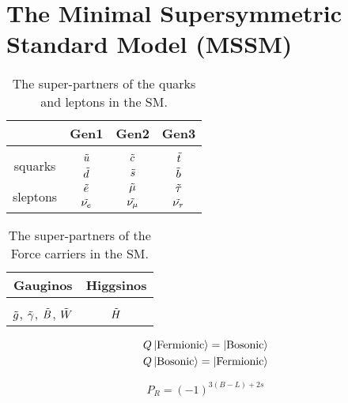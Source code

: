 \section{The Minimal Supersymmetric Standard Model (MSSM)}


\begin{table}[htbp]
    \centering
    \begin{tabular}{||c|c|c|c||}
    \hline
    & Gen1 & Gen2 & Gen3 \\
    \hline
    & \\[-2.7ex]
    \multirow{2}{1.4cm}{squarks} & $\Tilde{u}$ & $\Tilde{c}$ & \small$\Tilde{t}$ \\
     & $\Tilde{d}$ & $\Tilde{s}$ & $\Tilde{b}$ \\
    \hline
    
    \multirow{2}{1.4cm}{sleptons} & $\Tilde{e}$ & $\Tilde{\mu}$ & $\Tilde{\tau}$ \\
     & $\Tilde{\nu_e}$ & $\Tilde{\nu_\mu}$ & $\Tilde{\nu_\tau}$ \\
    \hline
    \end{tabular}
    \caption{The super-partners of the quarks and leptons in the SM.}
    \label{tab:SUSYspart}
\end{table}

\begin{table}[htbp]
    \centering
    \begin{tabular}{||c|c||}
    \hline 
       Gauginos  & Higgsinos \\
       \hline
        & \\[-2.5ex]
      $\Tilde{g}$, $\Tilde{\gamma}$, $\Tilde{B}$, $\Tilde{W}$ & $\Tilde{H}$ \\
     \hline
    \end{tabular}
    \caption{The super-partners of the Force carriers in the SM.}
    \label{tab:SUSYinos}
\end{table}


\begin{align}
     Q\ket{\text{Fermionic}} = \ket{\text{Bosonic}} 
     \label{eq:states1}
     \\
     Q\ket{\text{Bosonic}} = \ket{\text{Fermionic}}
     \label{eq:states2}
\end{align}




\begin{equation}
    P_R=(-1)^{3(B-L)+2s}
    \label{eq:MPrec}
\end{equation}

